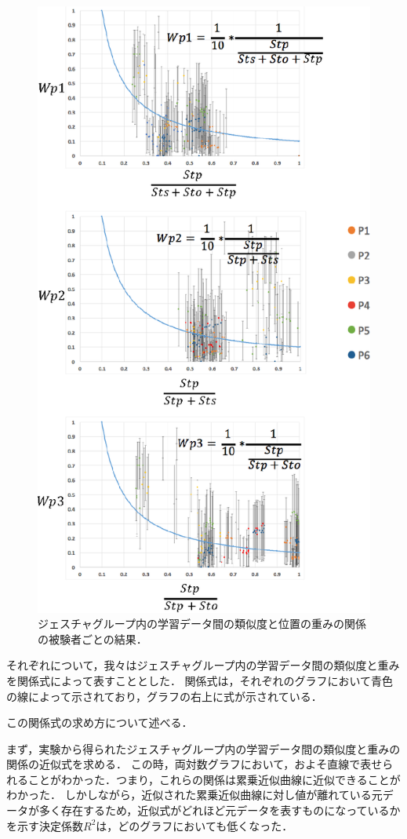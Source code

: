 \begin{figure}[!h]
\centering
\includegraphics[width=0.7\columnwidth]{img/weight_position.eps}
\caption{ジェスチャグループ内の学習データ間の類似度と位置の重みの関係の被験者ごとの結果．}
\label{fig:weight_position}
\end{figure}

それぞれについて，我々はジェスチャグループ内の学習データ間の類似度と重みを関係式によって表すこととした．
関係式は，それぞれのグラフにおいて青色の線によって示されており，グラフの右上に式が示されている．

この関係式の求め方について述べる．

まず，実験から得られたジェスチャグループ内の学習データ間の類似度と重みの関係の近似式を求める．
この時，両対数グラフにおいて，およそ直線で表せられることがわかった．つまり，これらの関係は累乗近似曲線に近似できることがわかった．
しかしながら，近似された累乗近似曲線に対し値が離れている元データが多く存在するため，近似式がどれほど元データを表すものになっているかを示す決定係数$R^2$は，どのグラフにおいても低くなった．

